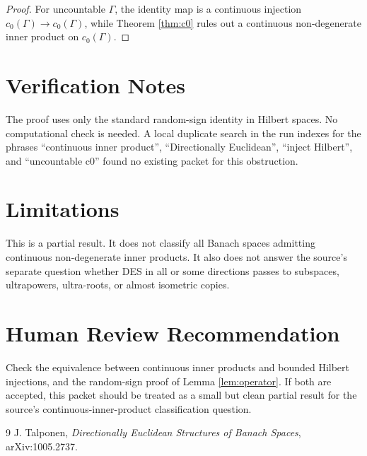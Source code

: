 \documentclass[11pt]{article}
\theoremstyle{remark}
\newcommand{\cnull}{c_0}
\newcommand{\GammaSet}{\Gamma}
\begin{document}
\begin{proof}
For uncountable \(\GammaSet\), the identity map is a continuous injection
\(\cnull(\GammaSet)\to\cnull(\GammaSet)\), while Theorem \ref{thm:c0} rules out
a continuous non-degenerate inner product on \(\cnull(\GammaSet)\).
\end{proof}

\section*{Verification Notes}

The proof uses only the standard random-sign identity in Hilbert spaces.
No computational check is needed.  A local duplicate search in the run indexes
for the phrases ``continuous inner product'', ``Directionally Euclidean'',
``inject Hilbert'', and ``uncountable c0'' found no existing packet for this
obstruction.

\section*{Limitations}

This is a partial result.  It does not classify all Banach spaces admitting
continuous non-degenerate inner products.  It also does not answer the source's
separate question whether DES in all or some directions passes to subspaces,
ultrapowers, ultra-roots, or almost isometric copies.

\section*{Human Review Recommendation}

Check the equivalence between continuous inner products and bounded Hilbert
injections, and the random-sign proof of Lemma \ref{lem:operator}.  If both are
accepted, this packet should be treated as a small but clean partial result for
the source's continuous-inner-product classification question.

\begin{thebibliography}{9}
J. Talponen,
\emph{Directionally Euclidean Structures of Banach Spaces},
arXiv:1005.2737.
\end{thebibliography}
\end{document}

